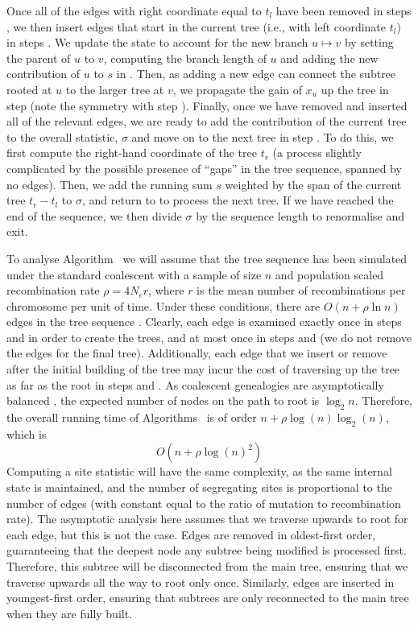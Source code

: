 \documentclass{article}
\begin{document}
Once all of the edges with right coordinate equal to $t_l$ have been removed in
steps , we then insert edges that start in the current tree
(i.e., with left coordinate $t_l$) in steps . We update the
state to account for the new branch $u \mapsto v$ by setting the parent of
$u$ to $v$, computing the branch length of $u$ and adding the new contribution
of $u$ to $s$ in . Then, as adding a new edge can connect the
subtree rooted at $u$ to the larger tree at $v$, we propagate the gain of $x_u$
up the tree in step  (note the symmetry with step ).
Finally, once we have removed and inserted all of the relevant edges, we are
ready to add the contribution of the current tree to the overall statistic,
$\sigma$ and move on to the next tree in step . To do this, we first
compute the right-hand coordinate of the tree $t_r$ (a process slightly
complicated by the possible presence of ``gaps'' in the tree sequence, spanned
by no edges). Then, we add the running sum $s$ weighted by the span of the
current tree $t_r - t_l$ to $\sigma$, and return to  to process the
next tree. If we have reached the end of the sequence, we then divide $\sigma$
by the sequence length to renormalise and exit.

To analyse Algorithm~ we will assume that the tree sequence has
been simulated under the standard coalescent with a sample of size
$n$ and population scaled recombination rate $\rho = 4 N_e r$,
where $r$ is the mean number of recombinations per chromosome per unit of time.
Under these conditions, there are $O(n + \rho \ln n)$ edges in the tree sequence
\citep{kelleher2016efficient}.  Clearly, each edge is examined
exactly once in steps  and  in order to create
the trees, and at most once in steps  and  (we do
not remove the edges for the final tree). Additionally, each edge that
we insert or remove after the initial building of the tree
may incur the cost of traversing up the tree as
far as the root in steps  and .
As coalescent genealogies are asymptotically
balanced \citep{li2013coalescent}, the expected number of nodes
on the path to root is $\log_2 n$.
Therefore, the overall running time
of Algorithms~ is of order $n + \rho \log(n) \log_2(n)$, which is
\[
    O\left(n + \rho \log(n)^2 \right)
\]
Computing a site statistic will have the same complexity,
as the same internal state is maintained,
and the number of segregating sites is proportional to the number of edges
(with constant equal to the ratio of mutation to recombination rate).
The asymptotic analysis here assumes that we traverse upwards to root
for each edge, but this is not the case. Edges are removed in
oldest-first order, guaranteeing that the deepest node any subtree being
modified is processed first. Therefore, this subtree will be disconnected from the
main tree, ensuring that we traverse upwards all the way to root only once.
Similarly, edges are inserted in youngest-first order, ensuring that subtrees are only
reconnected to the main tree when they are fully built.
\end{document}
